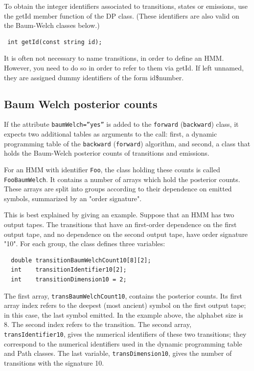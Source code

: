 \documentclass{article}
\begin{document}
To obtain the integer identifiers associated to transitions, states or emissions,
use the getId member function of the DP class.  (These identifiers are also valid on
the Baum-Welch classes below.)
\begin{verbatim}
 int getId(const string id);
\end{verbatim}
It is often not necessary to name transitions, in order to define an HMM.  However,
you need to do so in order to refer to them via getId.  If left unnamed, they are assigned
dummy identifiers of the form id\$number.


\subsection{Baum Welch posterior counts}


If the attribute {\tt baumWelch=''yes''} is added to the {\tt forward} ({\tt backward})
class, it expects two additional tables as arguments to the call: first, a dynamic programming 
table of the {\tt backward} ({\tt forward}) algorithm, and second, a class that holds
the Baum-Welch posterior counts of transitions and emissions.

For an HMM with identifier {\tt Foo}, the class holding these counts is called {\tt FooBaumWelch}.
It contains a number of arrays which hold the posterior counts.
These arrays are split into groups according to their dependence on emitted symbols,
summarized by an "order signature".  

This is best explained by giving an example.  Suppose that an 
HMM has two output tapes.  The transitions that have an first-order dependence on the 
first output tape, and no dependence on the second output tape, have order signature "10".
For each group, the class defines three variables:

\begin{verbatim}
  double transitionBaumWelchCount10[8][2];
  int    transitionIdentifier10[2];
  int    transitionDimension10 = 2;
\end{verbatim}
The first array, {\tt transBaumWelchCount10}, contains the posterior counts.  
Its first array index refers to the deepest (most ancient) symbol on the 
first output tape; in this case, the last symbol emitted.  In the example above, the
alphabet size is 8.  The second index refers to the transition.
The second array, {\tt transIdentifier10}, gives the numerical identifiers of these 
two transitions; they correspond to the numerical identifiers used in the dynamic
programming table and Path classes.
The last variable, {\tt transDimension10}, gives the number of transitions with the 
signature 10.
\end{document}

